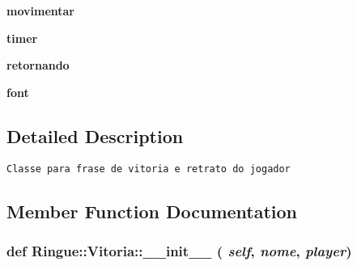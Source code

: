 \begin{CompactItemize}
\item 
\hypertarget{class_ringue_1_1_vitoria_23965573801efa85e308ee0bb66400a5}{
\textbf{movimentar}}
\label{class_ringue_1_1_vitoria_23965573801efa85e308ee0bb66400a5}

\item 
\hypertarget{class_ringue_1_1_vitoria_565b71925bcf35ee1d7437629c6d6465}{
\textbf{timer}}
\label{class_ringue_1_1_vitoria_565b71925bcf35ee1d7437629c6d6465}

\item 
\hypertarget{class_ringue_1_1_vitoria_2e506b730ab5d289a13bb103ec0f10d7}{
\textbf{retornando}}
\label{class_ringue_1_1_vitoria_2e506b730ab5d289a13bb103ec0f10d7}

\item 
\hypertarget{class_ringue_1_1_vitoria_9b2c4d075219b33c8c6657bf50c4b39c}{
\textbf{font}}
\label{class_ringue_1_1_vitoria_9b2c4d075219b33c8c6657bf50c4b39c}

\end{CompactItemize}


\subsection{Detailed Description}


\begin{footnotesize}\begin{verbatim}Classe para frase de vitoria e retrato do jogador \end{verbatim}
\end{footnotesize}
 

\subsection{Member Function Documentation}
\hypertarget{class_ringue_1_1_vitoria_c3e15c7ffa70671e3a04426dad66a321}{
\subsubsection[{\_\-\_\-init\_\-\_\-}]{\setlength{\rightskip}{0pt plus 5cm}def Ringue::Vitoria::\_\-\_\-init\_\-\_\- ( {\em self}, \/   {\em nome}, \/   {\em player})}}
\label{class_ringue_1_1_vitoria_c3e15c7ffa70671e3a04426dad66a321}




